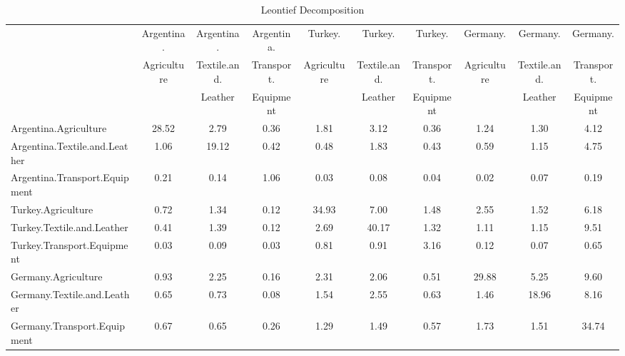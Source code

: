 \documentclass{article}
\begin{document}
\begin{table}[htbp] \scriptsize
    \begin{adjustwidth}{-1.15in}{-1.15in}  
  \centering
  \caption{Leontief Decomposition}
    \begin{tabular}{lccccccccc}
    \toprule
          & Argentina. & Argentina. & Argentina. & Turkey. & Turkey. & Turkey. & Germany. & Germany. & Germany.\\
          & Agriculture & Textile.and. & Transport. & Agriculture & Textile.and. & Transport. & Agriculture & Textile.and. & Transport.\\
          & & Leather & Equipment & & Leather & Equipment & & Leather & Equipment\\
    \midrule
    Argentina.Agriculture & 28.52 & 2.79  & 0.36  & 1.81  & 3.12  & 0.36  & 1.24  & 1.30  & 4.12 \\
    Argentina.Textile.and.Leather & 1.06  & 19.12 & 0.42  & 0.48  & 1.83  & 0.43  & 0.59  & 1.15  & 4.75 \\
    Argentina.Transport.Equipment & 0.21  & 0.14  & 1.06  & 0.03  & 0.08  & 0.04  & 0.02  & 0.07  & 0.19 \\
    Turkey.Agriculture & 0.72  & 1.34  & 0.12  & 34.93 & 7.00  & 1.48  & 2.55  & 1.52  & 6.18 \\
    Turkey.Textile.and.Leather & 0.41  & 1.39  & 0.12  & 2.69  & 40.17 & 1.32  & 1.11  & 1.15  & 9.51 \\
    Turkey.Transport.Equipment & 0.03  & 0.09  & 0.03  & 0.81  & 0.91  & 3.16  & 0.12  & 0.07  & 0.65 \\
    Germany.Agriculture & 0.93  & 2.25  & 0.16  & 2.31  & 2.06  & 0.51  & 29.88 & 5.25  & 9.60 \\
    Germany.Textile.and.Leather & 0.65  & 0.73  & 0.08  & 1.54  & 2.55  & 0.63  & 1.46  & 18.96 & 8.16 \\
    Germany.Transport.Equipment & 0.67  & 0.65  & 0.26  & 1.29  & 1.49  & 0.57  & 1.73  & 1.51  & 34.74 \\
    \bottomrule
    \end{tabular}
  \label{tab:leon}
      \end{adjustwidth}
\end{table}
\end{document}
